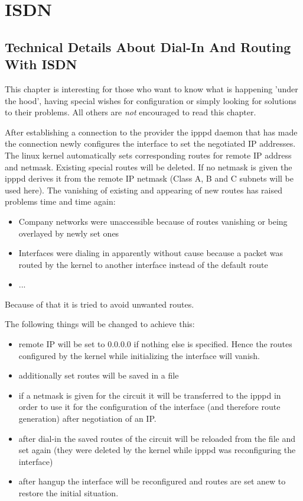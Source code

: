 \section{ISDN}
{
  \subsection{Technical Details About Dial-In And Routing With ISDN}
}

This chapter is interesting for those who want to know what is happening 
'under the hood', having special wishes for configuration or simply 
looking for solutions to their problems. All others are \emph{ not} 
encouraged to read this chapter.

After establishing a connection to the provider the ipppd daemon 
that has made the connection newly configures the interface to 
set the negotiated IP addresses. The linux kernel automatically sets 
corresponding routes for remote IP address and netmask. Existing 
special routes will be deleted. If no netmask is given the ipppd 
derives it from the remote IP netmask (Class A, B and C subnets 
will be used here). The vanishing of existing and appearing of new 
routes has raised problems time and time again:

\begin{itemize}
\item Company networks were unaccessible because of routes vanishing 
  or being overlayed by newly set ones
\item Interfaces were dialing in apparently without cause because a 
  packet was routed by the kernel to another interface instead of 
  the default route 
\item ...
\end{itemize}

Because of that it is tried to avoid unwanted routes.

The following things will be changed to achieve this:
\begin{itemize}

\item remote IP will be set to 0.0.0.0 if nothing else is specified. 
  Hence the routes configured by the kernel while initializing the 
  interface will vanish.
  
\item additionally set routes will be saved in a file

\item if a netmask is given for the circuit it will be transferred to 
  the ipppd in order to use it for the configuration of the interface 
  (and therefore route generation) after negotiation of an IP.

\item after dial-in the saved routes of the circuit will be reloaded 
  from the file and set again (they were deleted by the kernel while 
  ipppd was reconfiguring the interface)
  
\item after hangup the interface will be reconfigured and routes are 
  set anew to restore the initial situation.
\end{itemize}

